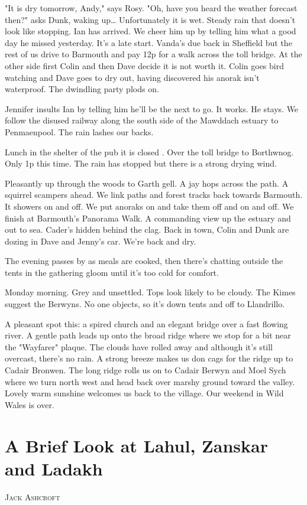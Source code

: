 \documentclass[a5paper,openany,font 10pt]{scrbook}
\makeatletter
\newcommand{\chapterauthor}[1]{%
{\parindent0pt\vspace*{-5pt}%
\linespread{1.1}\large\scshape#1%
\par\nobreak\vspace*{35pt}}
\@afterheading%
}
\makeatother
\begin{document}
"It  is  dry tomorrow, Andy," says Rosy.
"Oh, have you heard the weather forecast then?" asks Dunk,
waking up\ldots{}
Unfortunately it  is  wet. Steady rain that doesn't look like
stopping. Ian has arrived. We cheer him up by telling him what a
good day he missed yesterday.
It's a late start. Vanda's due back in Sheffield but the
rest of us drive to Barmouth and pay 12p for a walk across the
toll bridge. At the other side first Colin and then Dave decide
it is not worth it. Colin goes bird watching and Dave goes to dry
out, having discovered his anorak isn't waterproof. The dwindling
party plods on.

Jennifer insults Ian by telling him he'll be the next to go.
It works. He stays. We follow the disused railway along the south
side of the Mawddach estuary to Penmaenpool. The rain lashes our
backs.

Lunch in the shelter of the pub  it  is  closed . Over the
toll bridge to Borthwnog. Only 1p this time. The rain has stopped
but there is a strong drying wind.

Pleasantly up through the woods to Garth gell. A jay hops
across the path. A squirrel scampers ahead. We link paths and
forest tracks back towards Barmouth. It showers on and off. We
put anoraks on and take them off    and on and off.
We finish at Barmouth's Panorama Walk. A commanding view up
the estuary and out to sea. Cader's hidden behind the clag. Back
in town, Colin and Dunk are dozing in Dave and Jenny's car. We're
back and dry.

The evening passes by as meals are cooked, then there's
chatting outside the tents in the gathering gloom until it's too
cold for comfort.

Monday morning. Grey and unsettled. Tops look likely to be
cloudy. The Kimes suggest the Berwyns. No one objects, so it's
down tents and off to Llandrillo.

A pleasant spot this: a spired church and an elegant bridge
over a fast flowing river. A gentle path leads up onto the broad
ridge where we stop for a bit near the "Wayfarer" plaque. The
clouds have rolled away and although it's still overcast, there's
no rain. A strong breeze makes us don cags for the ridge up to
Cadair Bronwen. The long ridge rolls us on to Cadair Berwyn and
Moel Sych where we turn north west and head back over marshy
ground toward the valley. Lovely warm sunshine welcomes us back
to the village.
Our weekend in Wild Wales is over.

\chapter{A Brief Look at Lahul, Zanskar and Ladakh}
\label{sec:org582c71e}
\chapterauthor{Jack Ashcroft}
\end{document}
